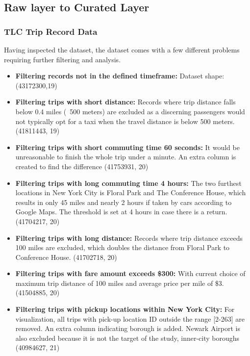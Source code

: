 \documentclass[11pt]{article}
\begin{document}
\subsection{Raw layer to Curated Layer}

\subsubsection{TLC Trip Record Data}
Having inspected the dataset, the dataset comes with a few different problems requiring further filtering and analysis.

\begin{itemize}
    \item \textbf{Filtering records not in the defined timeframe:} Dataset shape: (43172300,19) 
    \item \textbf{Filtering trips with short distance:} Records where trip distance falls below 0.4 miles (~500 meters) are excluded as a discerning passengers would not typically opt for a taxi when the travel distance is below 500 meters. (41811443, 19)
    \item \textbf{Filtering trips with short commuting time 60 seconds:} It would be unreasonable to finish the whole trip under a minute. An extra column is created to find the difference (41753931, 20)

    \item \textbf{Filtering trips with long commuting time 4 hours:} The two furthest locations in New York City is Floral Park and The Conference House, which results in only 45 miles and nearly 2 hours if taken by cars according to Google Maps. The threshold is set at 4 hours in case there is a return. (41704217, 20)
    
    \item \textbf{Filtering trips with long distance:} Records where trip distance exceeds 100 miles are excluded, which doubles the distance from Floral Park to Conference House. (41702718, 20)


    \item \textbf{Filtering trips with fare amount exceeds \$300:} With current choice of maximum trip distance of 100 miles and average price per mile of \$3. (41504885, 20)

    \item \textbf{Filtering trips with pickup locations within New York City:} For visualization, all trips with pick-up location ID outside the range [2-263] are removed. An extra column indicating borough is added. Newark Airport is also excluded because it is not the target of the study, inner-city boroughs (40984627, 21)
    
\end{itemize}
\end{document}
